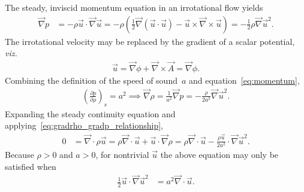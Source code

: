 \documentclass[letterpaper,11pt,nointlimits,reqno]{amsart}
\begin{document}
The steady, inviscid momentum equation in an irrotational flow yields
\begin{align}
    \vec{\nabla}p
    &= -\rho \vec{u}\cdot\vec{\nabla}\vec{u}
     = -\rho \left(   \frac{1}{2}\vec{\nabla}\left(\vec{u}\cdot\vec{u}\right)
                    - \vec{u}\times\vec{\nabla}\times\vec{u}
        \right)
     = - \frac{1}{2} \rho \vec{\nabla}\vec{u}^2
\label{eq:momentum}
.
\end{align}
The irrotational velocity may be replaced by the gradient of a scalar
potential, \emph{viz.}
\begin{align}
  \vec{u} = \vec{\nabla}\phi + \vec{\nabla}\times\vec{A} = \vec{\nabla}{\phi}
  .
\end{align}
Combining the definition of the speed of sound~$a$
and equation~\eqref{eq:momentum},
\begin{align}
    \left(\frac{\partial p}{\partial \rho}\right)_{s} = a^2
    \implies
    \vec{\nabla}\rho = \frac{1}{a^2} \vec{\nabla} p
                     = - \frac{\rho}{2a^2} \vec{\nabla}\vec{u}^2
\label{eq:gradrho_gradp_relationship}
.
\end{align}
Expanding the steady continuity equation and
applying~\eqref{eq:gradrho_gradp_relationship},
\begin{align}
  0 &= \vec{\nabla}\cdot\rho\vec{u}
     = \rho\vec{\nabla}\cdot\vec{u} + \vec{u}\cdot\vec{\nabla}\rho
     = \rho\vec{\nabla}\cdot\vec{u}
     - \frac{\rho\vec{u}}{2a^2} \cdot \vec{\nabla}\vec{u}^2
\label{eq:continuity}
.
\end{align}
Because $\rho>0$ and $a>0$, for nontrivial $\vec{u}$ the above
equation may only be satisfied when
\begin{align}
       \frac{1}{2} \vec{u}\cdot \vec{\nabla}\vec{u}^2
    &= a^2 \vec{\nabla}\cdot\vec{u}
.
\label{eq:momentum_and_continuity}
\end{align}
\end{document}
